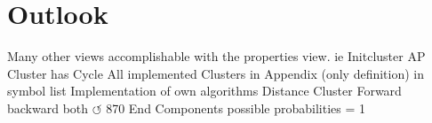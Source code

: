 \documentclass[preview]{standalone}
\begin{document}
\section{Outlook}
Many other views accomplishable with the properties view. ie Initcluster
AP Cluster has Cycle
All implemented Clusters in Appendix (only definition)
\intmodn {} \natnums in symbol list
Implementation of own algorithms
Distance Cluster Forward backward both
$\circlearrowleft$
870 End Components possible
probabilities = 1
\end{document}
